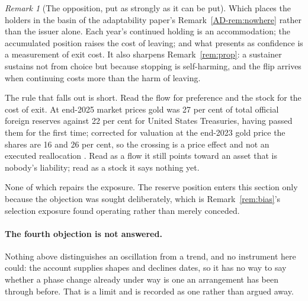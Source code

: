 \documentclass[11pt,a4paper]{article}
\theoremstyle{remark}
\newtheorem{remark}[definition]{Remark}
\begin{document}
\begin{remark}[The opposition, put as strongly as it can be put]
Which places the holders in the basin of the adaptability paper's Remark~\ref{AD-rem:nowhere} rather than the issuer alone. Each
year's continued holding is an accommodation; the accumulated position raises the cost of leaving; and
what presents as confidence is a measurement of exit cost. It also sharpens
Remark~\ref{rem:prop}: a sustainer sustains not from choice but because stopping is self-harming, and
the flip arrives when continuing costs more than the harm of leaving.

The rule that falls out is short. Read the flow for preference and the stock for the cost
of exit. At end-2025 market prices gold was 27 per cent of total official foreign reserves against 22
per cent for United States Treasuries, having passed them for the first time; corrected for valuation at
the end-2023 gold price the shares are 16 and 26 per cent, so the crossing is a price effect and not an
executed reallocation \citep{gold2026}. Read as a flow it still points toward an asset that is nobody's
liability; read as a stock it says nothing yet.

None of which repairs the exposure. The reserve position enters this section only because the
objection was sought deliberately, which is Remark~\ref{rem:bias}'s selection exposure found operating
rather than merely conceded.

\paragraph{The fourth objection is not answered.} Nothing above distinguishes an oscillation from a
trend, and no instrument here could: the account supplies shapes and declines dates, so it has no way to
say whether a phase change already under way is one an arrangement has been through before. That is a
limit and is recorded as one rather than argued away.
\end{remark}
\end{document}
